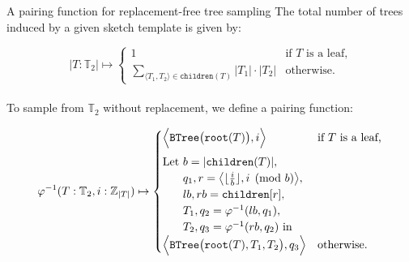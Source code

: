 \documentclass{beamer}
\begin{document}
\begin{frame}[fragile]{A pairing function for replacement-free tree sampling}
  The total number of trees induced by a given sketch template is given by:

  \begin{equation*}
    |T: \mathbb{T}_2| \mapsto \begin{cases}
                                1  & \text{if $T$ is a leaf,} \\
                                \sum_{\langle T_1, T_2\rangle \in \texttt{children}(T)} |T_1| \cdot |T_2| & \text{otherwise.}
    \end{cases}
  \end{equation*}\\

  To sample from $\mathbb{T}_2$ without replacement, we define a pairing function:

  \begin{equation*}
    \varphi^{-1}(T: \mathbb{T}_2, i: \mathbb{Z}_{|T|}) \mapsto \begin{cases}
      \Big\langle\texttt{BTree}\big(\texttt{root}(T)\big), i\Big\rangle & \text{if $T$ is a leaf,} \vspace{5pt}\\
      \text{Let } b = |\texttt{children}(T)|,\\
      \phantom{\text{Let }} q_1, r=\big\langle\lfloor\frac{i}{b}\rfloor, i \pmod{b}\big\rangle,\\
      \phantom{\text{Let }} lb, rb = \texttt{children}[r],\\
      \phantom{\text{Let }} T_1, q_2 = \varphi^{-1}(lb, q_1),\\
      \phantom{\text{Let }} T_2, q_3 = \varphi^{-1}(rb, q_2) \text{ in } \\
      \Big\langle\texttt{BTree}\big(\texttt{root}(T), T_1, T_2\big), q_3\Big\rangle & \text{otherwise.} \\
    \end{cases}
  \end{equation*}
\end{frame}
\end{document}
